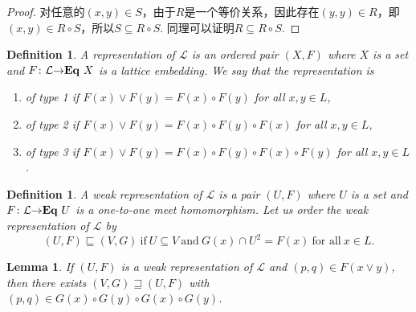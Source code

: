 \documentclass{article}
\newtheorem{lemma}[theorem]{Lemma}
\newtheorem{definition}[theorem]{Definition}
\newcommand*{\xfunc}[4]{{#2}\colon{#3}{#1}{#4}}
\newcommand*{\func}[3]{\xfunc{\to}{#1}{#2}{#3}}
\newcommand\lattice{\mathcal{L}}
\newcommand\eql[1]{\ensuremath\mathbf{Eq}~{#1}}
\begin{document}
\begin{proof}
对任意的$(x, y) \in S$，由于$R$是一个等价关系，因此存在$(y,y) \in R$，即$(x, y) \in R \circ S$，所以$S \subseteq R \circ S$. 同理可以证明$R \subseteq R \circ S$. 
\end{proof}

\begin{definition}
\rm A representation of $\lattice$ is an ordered pair $(X,F)$ where $X$ is a set and $\func{F}{\lattice}{\eql{X}}$ is a lattice embedding. We say that the representation is 
\begin{enumerate}
	\item of {\color{red} type 1} if $F(x) \vee F(y) = F(x) \circ F(y)$ for all $x,y \in L$,
	\item of {\color{red} type 2} if $F(x) \vee F(y) = F(x) \circ F(y) \circ F(x)$ for all $x,y \in L$,
	\item of {\color{red} type 3} if $F(x) \vee F(y) = F(x) \circ F(y) \circ F(x) \circ F(y)$ for all $x,y \in L$.
\end{enumerate}
\end{definition}

\newpage
\begin{definition}
\rm A {\color{red} weak representation} of $\lattice$ is a pair $(U,F)$ where $U$ is a set and $\func{F}{\lattice}{\eql{U}}$ is a one-to-one meet homomorphism. Let us order the weak representation of $\lattice$ by
$$
(U,F) \sqsubseteq (V,G)~\text{if}~U \subseteq V~\text{and}~G(x) \cap U^2 = F(x)~\text{for all}~x \in L.
$$
\end{definition}

\begin{lemma}
\rm If $(U,F)$ is a weak representation of $\lattice$ and $(p,q) \in F(x \vee y)$, then there exists $(V,G) \sqsupseteq (U,F)$  with $(p,q) \in G(x)\circ G(y) \circ G(x) \circ G(y)$.
\end{lemma}
\end{document}
